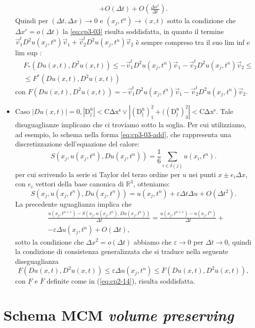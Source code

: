 \begin{itemize}
\[\begin{split}
   + O(\Delta t) + O(\frac{\Delta x^r}{\Delta t}).
\end{split}
\]
Quindi per  $(\Delta t,\Delta x)\to 0$ e $(x_j,t^n)\to(x,t)$ sotto la condizione che $\Delta x^r = o(\Delta t)$ la \eqref{eq:cp3-03} risulta soddisfatta, in quanto il termine $\vec{v}_1^tD^2u(x_j,t^n)\vec{v}_1 +\vec{v}_2^tD^2u(x_j,t^n)\vec{v}_2 $ è sempre compreso tra il suo lim inf e lim sup :
\[
\begin{split}
  &F_*(Du(x,t),D^2u(x,t))\le-\vec{v}_1^tD^2u(x_j,t^n)\vec{v}_1
  -\vec{v}_2^tD^2u(x_j,t^n)\vec{v}_2\le \\
  &\le F^*(Du(x,t),D^2u(x,t))
\end{split}
\]
con $F(Du(x,t),D^2u(x,t))=-\vec{v}_1^tD^2u(x_j,t^n)\vec{v}_1 -\vec{v}_2^tD^2u(x_j,t^n)\vec{v}_2$.
  \item \textsf{Caso} $|Du(x,t)|=0,\mathrm{|D_j^n|< C\Delta x^s\lor |(D_j^n)_1^2+((D_j^n)_3^2|< C\Delta x^s}$. Tale disuguaglianze implicano che ci troviamo sotto la soglia. Per cui utilizziamo, ad esempio, lo schema nella forma \eqref{eq:cp3-03-add}, che rappresenta una discretizzazione dell'equazione del calore:
\[
S(x_j,u(x_j,t^n),Du(x_j,t^n))=\frac{1}{6}\sum_{i\in\delta(j)}u(x_i,t^n).
\]
per cui scrivendo la serie si Taylor del terzo ordine per $u$ nei punti $x\pm e_i\Delta x$, con $e_i$ vettori della base canonica di $\mathbb{R}^3$, otteniamo:
\[
S(x_j,u(x_j,t^n),Du(x_j,t^n))=u(x_j,t^n) + \varepsilon\Delta t\Delta u + O(\Delta t^2).
\]
La precedente uguaglianza implica che
\[
\begin{split}
  &\frac{u(x_j,t^{n+1})-S(x_j,u(x_j,t^n),Du(x_j,t^n))}{\Delta t}= \frac{u(x_j,t^{n+1})-u(x_j,t^n)}{\Delta t} + \\
  &  -\varepsilon\Delta u(x_j,t^n) + O(\Delta t),
\end{split}
\]
sotto la condizione che $\Delta x^2=o(\Delta t)$ abbiamo che $\varepsilon\to 0$ per $\Delta t\to 0$, quindi la condizione di consistenza generalizzata che si traduce nella seguente diseguaglianza
\[
\underline{F}(Du(x,t),D^2u(x,t))\le\varepsilon\Delta u(x_j,t^n)\le \overline{F}(Du(x,t),D^2u(x,t)),
\]
con $\underline{F}$ e $\overline{F}$ definite come in (\hyperref[eq:cp2-14]{\ref{eq:cp2-14}}), risulta soddisfatta.  
\end{itemize}
%
\section{Schema MCM \emph{volume preserving}}
\label{sec:cp3-sc3-3}

